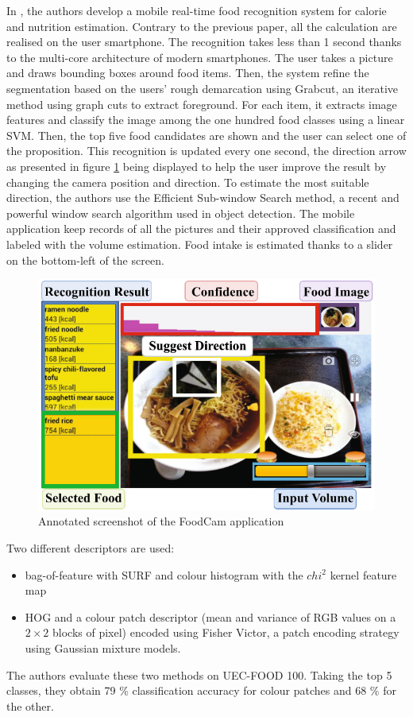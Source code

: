 In \cite{Kawano2014a}, the authors develop a mobile real-time food recognition system for calorie and nutrition estimation. Contrary to the previous paper, all the calculation are realised on the user smartphone. The recognition takes less than 1 second thanks to the multi-core architecture of modern smartphones.
The user takes a picture and draws bounding boxes around food items. Then, the system refine the segmentation based on the users' rough demarcation using Grabcut, an iterative method using graph cuts to extract foreground.
For each item, it extracts image features and classify the image among the one hundred food classes using a linear SVM. Then, the top five food candidates are shown and the user can select one of the proposition.
This recognition is updated every one second, the direction arrow as presented in figure  \ref{fig:food_cam} being displayed to help the user improve the result by changing the camera position and direction. To estimate the most suitable direction, the authors use the Efficient Sub-window Search method, a recent and powerful window search algorithm used in object detection.
The mobile application keep records of all the pictures and their approved classification and labeled with the volume estimation. Food intake is estimated thanks to a slider on the bottom-left of the screen.

\begin{figure}
    \centering
    \includegraphics[scale=0.6]{img/foodcam.jpg}
    \caption{Annotated screenshot of the FoodCam application}
    \label{fig:food_cam}
\end{figure}

Two different descriptors are used:
\begin{itemize}
    \item bag-of-feature with SURF and colour histogram with the $chi^2$ kernel feature map
    \item HOG and a colour patch descriptor (mean and variance of RGB values on a $2 \times 2$ blocks of pixel) encoded using Fisher Victor, a patch encoding strategy using Gaussian mixture models.
\end{itemize}
The authors evaluate these two methods on UEC-FOOD 100. Taking the top 5 classes, they obtain 79 \% classification accuracy for colour patches and 68 \% for the other.